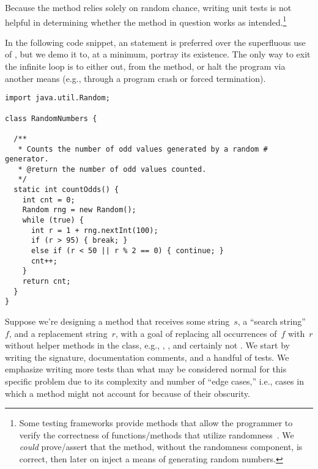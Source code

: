 Because the  method relies solely on random chance, writing unit tests is not helpful in determining whether the method in question works as intended.\footnote{Some testing frameworks provide methods that allow the programmer to verify the correctness of functions/methods that utilize randomness~. We \emph{could} prove/assert that the method, without the randomness component, is correct, then later on inject a means of generating random numbers.}

In the following code snippet, an  statement is preferred over the superfluous use of , but we demo it to, at a minimum, portray its existence. 
The only way to exit the infinite  loop is to either  out,  from the method, or halt the program via another means (e.g., through a program crash or forced termination).

\enlargethispage{-2\baselineskip}
\begin{lstlisting}[language=MyJava]
import java.util.Random;

class RandomNumbers {

  /**
   * Counts the number of odd values generated by a random # generator.
   * @return the number of odd values counted.
   */
  static int countOdds() {
    int cnt = 0;
    Random rng = new Random();
    while (true) {
      int r = 1 + rng.nextInt(100);
      if (r > 95) { break; }
      else if (r < 50 || r % 2 == 0) { continue; }
      cnt++;
    }
    return cnt;
  }
}
\end{lstlisting}

Suppose we're designing a method that receives some string~$s$, a ``search string''~$f$, and a replacement string~$r$, with a goal of replacing all occurrences of~$f$ with~$r$ without helper methods in the  class, e.g., , , and certainly not . 
We start by writing the signature, documentation comments, and a handful of tests. 
We emphasize writing more tests than what may be considered normal for this specific problem due to its complexity and number of ``edge cases,'' i.e., cases in which a method might not account for because of their obscurity.

